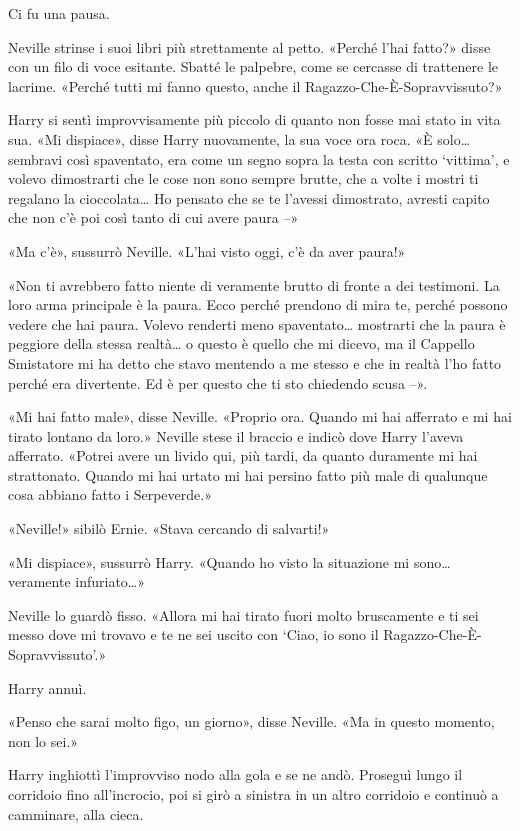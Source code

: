 Ci fu una pausa.

Neville strinse i suoi libri più strettamente al petto. «Perché l’hai fatto?» disse con un filo di voce esitante. Sbatté le palpebre, come se cercasse di trattenere le lacrime. «Perché tutti mi fanno questo, anche il Ragazzo-Che-È-Sopravvissuto?»

Harry si sentì improvvisamente più piccolo di quanto non fosse mai stato in vita sua. «Mi dispiace», disse Harry nuovamente, la sua voce ora roca. «È solo… sembravi così spaventato, era come un segno sopra la testa con scritto ‘vittima’, e volevo dimostrarti che le cose non sono sempre brutte, che a volte i mostri ti regalano la cioccolata… Ho pensato che se te l’avessi dimostrato, avresti capito che non c’è poi così tanto di cui avere paura –»

«Ma c’è», sussurrò Neville. «L’hai visto oggi, c’è da aver paura!»

«Non ti avrebbero fatto niente di veramente brutto di fronte a dei testimoni. La loro arma principale è la paura. Ecco perché prendono di mira te, perché possono vedere che hai paura. Volevo renderti meno spaventato… mostrarti che la paura è peggiore della stessa realtà… o questo è quello che mi dicevo, ma il Cappello Smistatore mi ha detto che stavo mentendo a me stesso e che in realtà l’ho fatto perché era divertente. Ed è per questo che ti sto chiedendo scusa –».

«Mi hai fatto male», disse Neville. «Proprio ora. Quando mi hai afferrato e mi hai tirato lontano da loro.» Neville stese il braccio e indicò dove Harry l’aveva afferrato. «Potrei avere un livido qui, più tardi, da quanto duramente mi hai strattonato. Quando mi hai urtato mi hai persino fatto più male di qualunque cosa abbiano fatto i Serpeverde.»

«Neville!» sibilò Ernie. «Stava cercando di salvarti!»

«Mi dispiace», sussurrò Harry. «Quando ho visto la situazione mi sono… veramente infuriato…»

Neville lo guardò fisso. «Allora mi hai tirato fuori molto bruscamente e ti sei messo dove mi trovavo e te ne sei uscito con ‘Ciao, io sono il Ragazzo-Che-È-Sopravvissuto’.»

Harry annuì.

«Penso che sarai molto figo, un giorno», disse Neville. «Ma in questo momento, non lo sei.»

Harry inghiottì l’improvviso nodo alla gola e se ne andò. Proseguì lungo il corridoio fino all’incrocio, poi si girò a sinistra in un altro corridoio e continuò a camminare, alla cieca.

